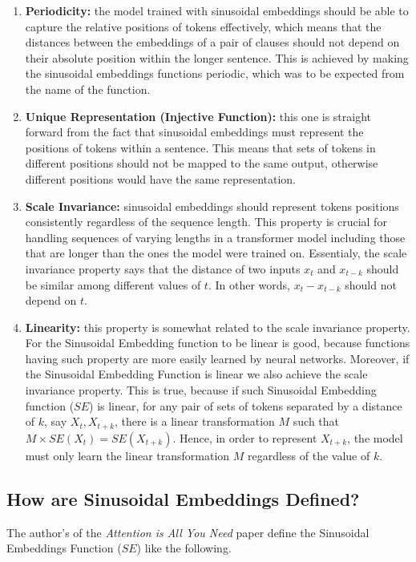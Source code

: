 \documentclass{article}
\begin{document}
\begin{enumerate}
	\item \textbf{Periodicity:} the model trained with sinusoidal embeddings should be able to capture the relative positions of tokens effectively, which means that the distances between the embeddings of a pair of clauses should not depend on their absolute position within the longer sentence. This is achieved by making the sinusoidal embeddings functions periodic, which was to be expected from the name of the function. 
	\item \textbf{Unique Representation (Injective Function):} this one is straight forward from the fact that  sinusoidal embeddings must represent the positions of tokens within a sentence. This means that sets of tokens in different positions should not be mapped to the same output, otherwise different positions would have the same representation.
	\item \textbf{Scale Invariance:} sinusoidal embeddings should represent tokens positions consistently regardless of the sequence length. This property is crucial for handling sequences of varying lengths in a transformer model including those that are longer than the ones the model were trained on. Essentialy, the scale invariance property says that the distance of two inputs $x_t$ and $x_{t - k}$ should be similar among different values of $t$. In other words, $x_t - x_{t - k}$ should not depend on $t$.
	\item \textbf{Linearity:} this property is somewhat related to the scale invariance property. For the Sinusoidal Embedding function to be linear is good, because functions having such property are more easily learned by neural networks. Moreover, if the Sinusoidal Embedding Function is linear we also achieve the scale invariance property. This is true, because if such Sinusoidal Embedding function ($SE$) is linear, for any pair of sets of tokens separated by a distance of $k$, say $X_t, X_{t+k}$, there is a linear transformation $M$ such that $M \times SE(X_t) = SE(X_{t+k})$. Hence, in order to represent $X_{t+k}$,  the model must only learn the linear transformation $M$ regardless of the value of $k$. 
\end{enumerate}


\subsection{How are Sinusoidal Embeddings Defined?}

The author's of the \textit{Attention is All You Need} paper define the Sinusoidal Embeddings Function ($SE$) like the following.
\end{document}
